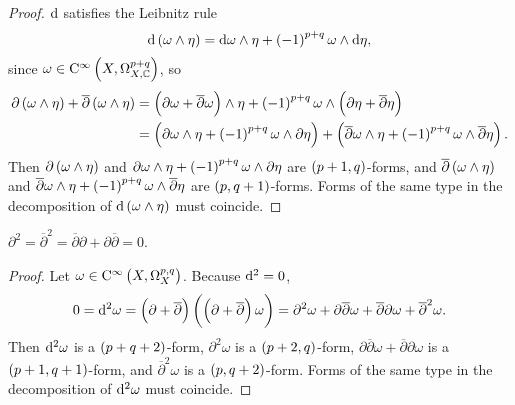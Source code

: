 \begin{proof}
$ \mathrm{d} $ satisfies the Leibnitz rule
$$ \d\br{\omega \wedge \eta} = \d\omega \wedge \eta + \br{-1}^{p + q}\omega \wedge \d\eta, $$
since $ \omega \in \C^\infty\br{X, \Omega_{X, \CC}^{p + q}} $, so
\begin{align*}
\partial\br{\omega \wedge \eta} + \overline{\partial}\br{\omega \wedge \eta}
& = \br{\partial\omega + \overline{\partial}\omega} \wedge \eta + \br{-1}^{p + q}\omega \wedge \br{\partial\eta + \overline{\partial}\eta} \\
& = \br{\partial\omega \wedge \eta + \br{-1}^{p + q}\omega \wedge \partial\eta} + \br{\overline{\partial}\omega \wedge \eta + \br{-1}^{p + q}\omega \wedge \overline{\partial}\eta}.
\end{align*}
Then $ \partial\br{\omega \wedge \eta} $ and $ \partial\omega \wedge \eta + \br{-1}^{p + q}\omega \wedge \partial\eta $ are $ \br{p + 1, q} $-forms, and $ \overline{\partial}\br{\omega \wedge \eta} $ and $ \overline{\partial}\omega \wedge \eta + \br{-1}^{p + q}\omega \wedge \overline{\partial}\eta $ are $ \br{p, q + 1} $-forms. Forms of the same type in the decomposition of $ \d\br{\omega \wedge \eta} $ must coincide.
\end{proof}

\begin{lemma}
$ \partial^2 = \overline{\partial}^2 = \overline{\partial}\partial + \partial\overline{\partial} = 0 $.
\end{lemma}

\begin{proof}
Let $ \omega \in \C^\infty\br{X, \Omega_X^{p, q}} $. Because $ \mathrm{d}^2 = 0 $,
$$ 0 = \d^2\omega = \br{\partial + \overline{\partial}}\br{\br{\partial + \overline{\partial}}\omega} = \partial^2\omega + \partial\overline{\partial}\omega + \overline{\partial}\partial\omega + \overline{\partial}^2\omega. $$
Then $ \mathrm{d}^2\omega $ is a $ \br{p + q + 2} $-form, $ \partial^2\omega $ is a $ \br{p + 2, q} $-form, $ \partial\overline{\partial}\omega + \overline{\partial}\partial\omega $ is a $ \br{p + 1, q + 1} $-form, and $ \overline{\partial}^2\omega $ is a $ \br{p, q + 2} $-form. Forms of the same type in the decomposition of $ \mathrm{d}^2\omega $ must coincide.
\end{proof}


